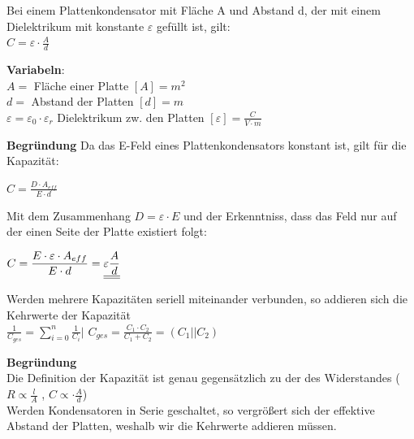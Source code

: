 \begingl
Bei einem Plattenkondensator mit Fläche A und Abstand d, der mit einem Dielektrikum mit konstante $\varepsilon$ gefüllt ist, gilt: \\
\formulaBegin
$ \displaystyle C = \varepsilon \cdot \frac{A}{ d}$
\formulaEnd

\textbf{Variabeln}: \\
$A = $ Fläche einer Platte $ [A] = m^2 $ \\
$d = $ Abstand der Platten $ [d] = m$ \\
$ \varepsilon = \varepsilon_0 \cdot \varepsilon_r $ Dielektrikum zw. den Platten $ [\varepsilon] = \frac{C}{V\cdot m}$ \\

\iend

\textbf{Begründung}
Da das E-Feld eines Plattenkondensators konstant ist, gilt für die Kapazität:
\fix
\fix
\begin{center}
	$ C= \displaystyle \frac{D \cdot A_{eff} } {E \cdot d} $
\end{center}
\fix
\fix
Mit dem Zusammenhang $ D = \varepsilon \cdot E$ und der Erkenntniss, dass das Feld nur auf der einen Seite der Platte existiert folgt:
\fix \fix
\begin{center}
	$ C= \displaystyle \frac{E \cdot \varepsilon \cdot A_{eff} } {E  \cdot d}  = \underline{\underline{\displaystyle \varepsilon \frac{A} { d}}}$
\end{center}




\beginip
Werden mehrere Kapazitäten seriell miteinander verbunden, so addieren sich die Kehrwerte der Kapazität \\
\formulaBegin
$\displaystyle \frac{1}{C_{ges}} = \sum_{i=0}^n \frac{1}{C_i} \Bigg\rvert$
$\displaystyle C_{ges} = \frac{C_1 \cdot C_2}{C_1 + C_2} = (C_1 || C_2)$
\formulaEnd
\iend


\textbf{Begründung} \\
Die Definition der Kapazität ist genau gegensätzlich zu der des Widerstandes ($ R \propto \frac{l}{A}$ , $ C \propto \cdot \frac{A}{d} $)\\
Werden Kondensatoren in Serie geschaltet, so vergrößert sich der effektive Abstand der Platten, weshalb wir die Kehrwerte addieren müssen. \\




